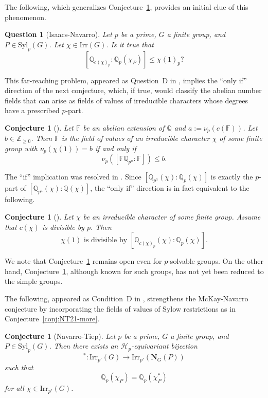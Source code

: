 \documentclass[12pt]{amsart}
\newtheorem{conjecture}[theorem]{Conjecture}
\newtheorem{question}[theorem]{Question}
\theoremstyle{definition}
\numberwithin{equation}{section}
\newcommand{\Irr}{{\mathrm {Irr}}}
\newcommand{\Syl}{{\mathrm {Syl}}}
\newcommand{\QQ}{{\mathbb Q}}
\newcommand{\ZZ}{{\mathbb Z}}
\newcommand{\FF}{{\mathbb F}}
\newcommand{\bN}{{\mathbf{N}}}
\begin{document}
The following, which generalizes
Conjecture~\ref{conj:Navarro-Tiep21-more}, provides an initial clue
of this phenomenon.

\begin{question}[Isaacs-Navarro]\label{conj:Isaacs-Navarro24}
Let $p$ be a prime, $G$ a finite group, and $P\in\Syl_p(G)$. Let
$\chi\in\Irr(G)$. Is it true that
\[[\QQ_{c(\chi)_p}:\QQ_p(\chi_P)]\leq \chi(1)_p?\]
\end{question}

This far-reaching problem, appeared as Question~D in
\cite{Isaacs-Navarro24}, implies the ``only if'' direction of the
next conjecture, which, if true, would classify the abelian number
fields that can arise as fields of values of irreducible characters
whose degrees have a prescribed $p$-part.

\begin{conjecture}[\cite{HNT25}]\label{conj:HNT25-a} Let $\FF$ be an abelian extension of $\QQ$ and $a:=\nu_p(c(\FF))$.
Let $b\in\ZZ_{\geq 0}$. Then $\FF$ is the field of values of an
irreducible character $\chi$ of some finite group with
$\nu_p(\chi(1))=b$ if and only if
\[ \nu_p([\FF\QQ_{p^a} : \FF])\leq b.\]
\end{conjecture}

The ``if'' implication was resolved in \cite{HNT25}. Since
$[\QQ_{p^a}(\chi): \QQ_p(\chi)]$ is exactly the $p$-part of
$[\QQ_{p^a}(\chi): \QQ(\chi)]$, the ``only if'' direction is in fact
equivalent to the following.


\begin{conjecture}[\cite{HNT25}]\label{conj:HNT25} Let $\chi$ be an irreducible character
of some finite group. Assume that $c(\chi)$ is divisible by $p$.
Then
\[\chi(1) \text{ is divisible by } [\QQ_{c(\chi)_p}(\chi): \QQ_p(\chi)].\]
\end{conjecture}

We note that Conjecture~\ref{conj:Isaacs-Navarro24} remains open
even for $p$-solvable groups. On the other hand,
Conjecture~\ref{conj:HNT25}, although known for such groups, has not
yet been reduced to the simple groups.

The following, appeared as Condition~D in \cite{Navarro-Tiep21},
strengthens the McKay-Navarro conjecture by incorporating the fields
of values of Sylow restrictions as in
Conjecture~\ref{conj:NT21-more}.

\begin{conjecture}[Navarro-Tiep]\label{conj:Navarro-Tiep21-more}
Let $p$ be a prime, $G$ a finite group, and $P\in\Syl_p(G)$. Then
there exists an $\mathcal{H}_p$-equivariant bijection \[^*:
\Irr_{p'}(G) \rightarrow \Irr_{p'}(\bN_G(P))\] such that
\[\QQ_p(\chi_P)=\QQ_p(\chi^\ast_P)\] for all $\chi\in\Irr_{p'}(G)$.
\end{conjecture}
\end{document}
